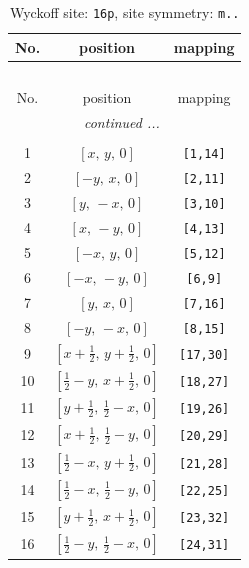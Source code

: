 \documentclass[fleqn,8pt]{jsarticle}
\begin{document}
\begin{longtable}{ccc}
\caption{Wyckoff site: {\tt 16p}, site symmetry: {\tt m..}}
 \\
 \hline \hline
No. & position & mapping \\ \hline \endfirsthead

\multicolumn{2}{l}{\tablename\ \thetable{}} \\
 \hline \hline
No. & position & mapping \\ \hline \endhead

 \hline \hline
\multicolumn{2}{r}{\footnotesize\it continued ...} \\ \endfoot

 \hline \hline
\multicolumn{2}{r}{} \\ \endlastfoot

1 & $\left[ x,\, y,\, 0 \right]$ & {\tt [1,14]} \\ \hline
2 & $\left[ - y,\, x,\, 0 \right]$ & {\tt [2,11]} \\ \hline
3 & $\left[ y,\, - x,\, 0 \right]$ & {\tt [3,10]} \\ \hline
4 & $\left[ x,\, - y,\, 0 \right]$ & {\tt [4,13]} \\ \hline
5 & $\left[ - x,\, y,\, 0 \right]$ & {\tt [5,12]} \\ \hline
6 & $\left[ - x,\, - y,\, 0 \right]$ & {\tt [6,9]} \\ \hline
7 & $\left[ y,\, x,\, 0 \right]$ & {\tt [7,16]} \\ \hline
8 & $\left[ - y,\, - x,\, 0 \right]$ & {\tt [8,15]} \\ \hline
9 & $\left[ x + \frac{1}{2},\, y + \frac{1}{2},\, 0 \right]$ & {\tt [17,30]} \\ \hline
10 & $\left[ \frac{1}{2} - y,\, x + \frac{1}{2},\, 0 \right]$ & {\tt [18,27]} \\ \hline
11 & $\left[ y + \frac{1}{2},\, \frac{1}{2} - x,\, 0 \right]$ & {\tt [19,26]} \\ \hline
12 & $\left[ x + \frac{1}{2},\, \frac{1}{2} - y,\, 0 \right]$ & {\tt [20,29]} \\ \hline
13 & $\left[ \frac{1}{2} - x,\, y + \frac{1}{2},\, 0 \right]$ & {\tt [21,28]} \\ \hline
14 & $\left[ \frac{1}{2} - x,\, \frac{1}{2} - y,\, 0 \right]$ & {\tt [22,25]} \\ \hline
15 & $\left[ y + \frac{1}{2},\, x + \frac{1}{2},\, 0 \right]$ & {\tt [23,32]} \\ \hline
16 & $\left[ \frac{1}{2} - y,\, \frac{1}{2} - x,\, 0 \right]$ & {\tt [24,31]} \\
\end{longtable}
\end{document}
